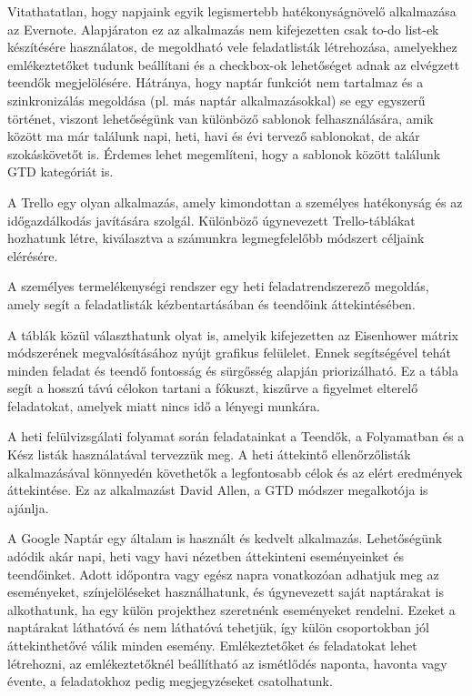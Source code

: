 
Vitathatatlan, hogy napjaink egyik legismertebb hatékonyságnövelő alkalmazása az Evernote. Alapjáraton ez az alkalmazás nem kifejezetten csak to-do list-ek készítésére használatos, de megoldható vele feladatlisták létrehozása, amelyekhez emlékeztetőket tudunk beállítani és a checkbox-ok lehetőséget adnak az elvégzett teendők megjelölésére. Hátránya, hogy naptár funkciót nem tartalmaz és a szinkronizálás megoldása (pl. más naptár alkalmazásokkal) se egy egyszerű történet, viszont lehetőségünk van különböző sablonok felhasználására, amik között ma már találunk napi, heti, havi és évi tervező sablonokat, de akár szokáskövetőt is. Érdemes lehet megemlíteni, hogy a sablonok között találunk GTD kategóriát is.


A Trello egy olyan alkalmazás, amely kimondottan a személyes hatékonyság és az időgazdálkodás javítására szolgál. Különböző úgynevezett Trello-táblákat hozhatunk létre, kiválasztva a számunkra legmegfelelőbb módszert céljaink elérésére.

A személyes termelékenységi rendszer egy heti feladatrendszerező megoldás, amely segít a feladatlisták kézbentartásában és teendőink áttekintésében.

A táblák közül választhatunk olyat is, amelyik kifejezetten az Eisenhower mátrix módszerének megvalósításához nyújt grafikus felülelet. Ennek segítségével tehát minden feladat és teendő fontosság és sürgősség alapján priorizálható. Ez a tábla segít a hosszú távú célokon tartani a fókuszt, kiszűrve a figyelmet elterelő feladatokat, amelyek miatt nincs idő a lényegi munkára.

A heti felülvizsgálati folyamat során feladatainkat a Teendők, a Folyamatban és a Kész listák használatával tervezzük meg. A heti áttekintő ellenőrzőlisták alkalmazásával könnyedén követhetők a legfontosabb célok és az elért eredmények áttekintése. Ez az alkalmazást David Allen, a GTD módszer megalkotója is ajánlja.\cite{trello}



A Google Naptár egy általam is használt és kedvelt alkalmazás. Lehetőségünk adódik akár napi, heti vagy havi nézetben áttekinteni eseményeinket és teendőinket. Adott időpontra vagy egész napra vonatkozóan adhatjuk meg az eseményeket, színjelöléseket használhatunk, és úgynevezett saját naptárakat is alkothatunk, ha egy külön projekthez szeretnénk eseményeket rendelni. Ezeket a naptárakat láthatóvá és nem láthatóvá tehetjük, így külön csoportokban jól áttekinthetővé válik minden esemény. Emlékeztetőket és feladatokat lehet létrehozni, az emlékeztetőknél beállítható az ismétlődés naponta, havonta vagy évente, a feladatokhoz pedig megjegyzéseket csatolhatunk.

